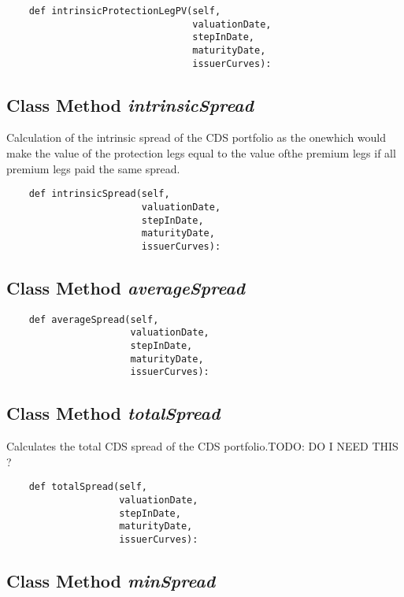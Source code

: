 \documentclass[twoside,11pt]{book}
\begin{document}
\begin{lstlisting}
    def intrinsicProtectionLegPV(self,
                                 valuationDate,
                                 stepInDate,
                                 maturityDate,
                                 issuerCurves):
\end{lstlisting}

\subsection{Class Method {\it intrinsicSpread}}
Calculation of the intrinsic spread of the CDS portfolio as the onewhich would make the value of the protection legs equal to the value ofthe premium legs if all premium legs paid the same spread. 

\begin{lstlisting}
    def intrinsicSpread(self,
                        valuationDate,
                        stepInDate,
                        maturityDate,
                        issuerCurves):
\end{lstlisting}

\subsection{Class Method {\it averageSpread}}


\begin{lstlisting}
    def averageSpread(self,
                      valuationDate,
                      stepInDate,
                      maturityDate,
                      issuerCurves):
\end{lstlisting}

\subsection{Class Method {\it totalSpread}}
Calculates the total CDS spread of the CDS portfolio.TODO: DO I NEED THIS ? 

\begin{lstlisting}
    def totalSpread(self,
                    valuationDate,
                    stepInDate,
                    maturityDate,
                    issuerCurves):
\end{lstlisting}

\subsection{Class Method {\it minSpread}}
\end{document}

